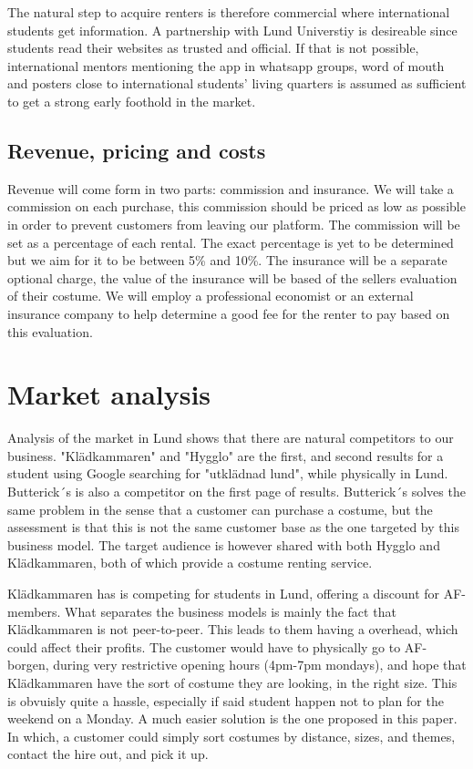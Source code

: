\documentclass[a4paper, titlepage]{article}
\begin{document}
The natural step to acquire renters is therefore commercial where international students get information. A partnership with Lund Universtiy is desireable since students read their websites as trusted and official. If that is not possible, international mentors mentioning the app in whatsapp groups, word of mouth and posters close to international students' living quarters is assumed as sufficient to get a strong early foothold in the market. 

\subsection{Revenue, pricing and costs}
Revenue will come form in two parts: commission and insurance. We will take a commission on each purchase, this commission should be priced as low as possible in order to prevent customers from leaving our platform. The commission will be set as a percentage of each rental. The exact percentage is yet to be determined but we aim for it to be between 5\% and 10\%. The insurance will be a separate optional charge, the value of the insurance will be based of the sellers evaluation of their costume. We will employ a professional economist or an external insurance company to help determine a good fee for the renter to pay based on this evaluation.


\section{Market analysis}
Analysis of the market in Lund shows that there are natural competitors to our business. "Klädkammaren" and "Hygglo" are the first, and second results for a student using Google searching for "utklädnad lund", while physically in Lund. Butterick´s is also a competitor on the first page of results. Butterick´s solves the same problem in the sense that a customer can purchase a costume, but the assessment is that this is not the same customer base as the one targeted by this business model. The target audience is however shared with both Hygglo and Klädkammaren, both of which provide a costume renting service. 

Klädkammaren has is competing for students in Lund, offering a discount for AF-members. What separates the business models is mainly the fact that Klädkammaren is not peer-to-peer. This leads to them having a overhead, which could affect their profits. The customer would have to physically go to AF-borgen, during very restrictive opening hours (4pm-7pm mondays), and hope that Klädkammaren have the sort of costume they are looking, in the right size. This is obvuisly quite a hassle, especially if said student happen not to plan for the weekend on a Monday. A much easier solution is the one proposed in this paper. In which, a customer could simply sort costumes by distance, sizes, and themes, contact the hire out, and pick it up.  
\end{document}
